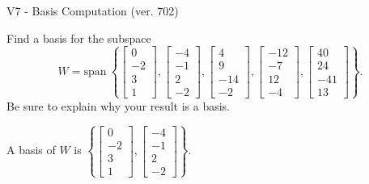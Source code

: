 \begin{exercise}
  \begin{exerciseTitle}V7 - Basis Computation (ver. 702)\end{exerciseTitle}
  \begin{exerciseStatement}
    Find a basis for the subspace 
\[W=\mathrm{span}\ \left\{\left[\begin{array}{r}
0 \\
-2 \\
3 \\
1
\end{array}\right] , \left[\begin{array}{r}
-4 \\
-1 \\
2 \\
-2
\end{array}\right] , \left[\begin{array}{r}
4 \\
9 \\
-14 \\
-2
\end{array}\right] , \left[\begin{array}{r}
-12 \\
-7 \\
12 \\
-4
\end{array}\right] , \left[\begin{array}{r}
40 \\
24 \\
-41 \\
13
\end{array}\right]\right\}.\]
 Be sure to explain why your result is a basis.


  \end{exerciseStatement}
  \begin{exerciseAnswer}
   A basis of \(W\) is  \(\left\{\left[\begin{array}{r}
0 \\
-2 \\
3 \\
1
\end{array}\right] , \left[\begin{array}{r}
-4 \\
-1 \\
2 \\
-2
\end{array}\right]\right\}\).
  


  \end{exerciseAnswer}
\end{exercise}